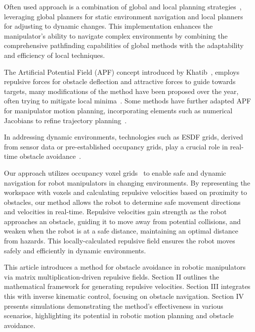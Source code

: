 \documentclass[letterpaper, 10 pt, conference]{ieeeconf}  %
\begin{document}
Often used approach is a combination of global and local planning strategies~\cite{c44}, leveraging global planners for static environment navigation and local planners for adjusting to dynamic changes. This implementation enhances the manipulator's ability to navigate complex environments by combining the comprehensive pathfinding capabilities of global methods with the adaptability and efficiency of local techniques.

The Artificial Potential Field (APF) concept introduced by Khatib~\cite{c33}, employs repulsive forces for obstacle deflection and attractive forces to guide towards targets, many modifications of the method have been proposed over the year, often trying to mitigate local minima~\cite{c43,c45,c47,klancar2022robot}. Some methods have further adapted APF for manipulator motion planning, incorporating elements such as numerical Jacobians to refine trajectory planning~\cite{c49,park2020trajectory,baumgartner2023potential}.

In addressing dynamic environments, technologies such as ESDF grids, derived from sensor data or pre-established occupancy grids, play a crucial role in real-time obstacle avoidance~\cite{oleynikova2017voxblox,han2019fiesta,lau2010improved,rong2006jump,zhou2021egoplanner}. 


Our approach utilizes occupancy voxel grids~\cite{han2018dynamic} to enable safe and dynamic navigation for robot manipulators in changing environments. By representing the workspace with voxels and calculating repulsive velocities based on proximity to obstacles, our method allows the robot to determine safe movement directions and velocities in real-time. Repulsive velocities gain strength as the robot approaches an obstacle, guiding it to move away from potential collisions, and weaken when the robot is at a safe distance, maintaining an optimal distance from hazards. This locally-calculated repulsive field ensures the robot moves safely and efficiently in dynamic environments.

This article introduces a method for obstacle avoidance in robotic manipulators via matrix multiplication-driven repulsive fields. Section II outlines the mathematical framework for generating repulsive velocities. Section III integrates this with inverse kinematic control, focusing on obstacle navigation. Section IV presents simulations demonstrating the method's effectiveness in various scenarios, highlighting its potential in robotic motion planning and obstacle avoidance.
\end{document}
